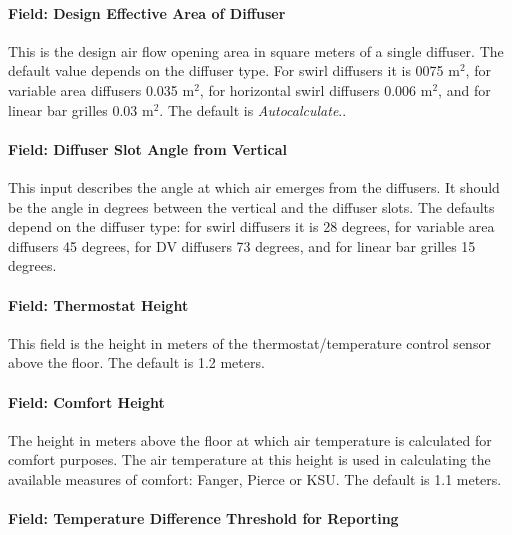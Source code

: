 \paragraph{Field: Design Effective Area of Diffuser}\label{field-design-effective-area-of-diffuser-1}

This is the design air flow opening area in square meters of a single diffuser. The default value depends on the diffuser type. For swirl diffusers it is 0075 m\(^{2}\), for variable area diffusers 0.035 m\(^{2}\), for horizontal swirl diffusers 0.006 m\(^{2}\), and for linear bar grilles 0.03 m\(^{2}\). The default is \emph{Autocalculate}..

\paragraph{Field: Diffuser Slot Angle from Vertical}\label{field-diffuser-slot-angle-from-vertical-1}

This input describes the angle at which air emerges from the diffusers. It should be the angle in degrees between the vertical and the diffuser slots. The defaults depend on the diffuser type: for swirl diffusers it is 28 degrees, for variable area diffusers 45 degrees, for DV diffusers 73 degrees, and for linear bar grilles 15 degrees.

\paragraph{Field: Thermostat Height}\label{field-thermostat-height-3}

This field is the height in meters of the thermostat/temperature control sensor above the floor. The default is 1.2 meters.

\paragraph{Field: Comfort Height}\label{field-comfort-height-2}

The height in meters above the floor at which air temperature is calculated for comfort purposes. The air temperature at this height is used in calculating the available measures of comfort: Fanger, Pierce or KSU. The default is 1.1 meters.

\paragraph{Field: Temperature Difference Threshold for Reporting}\label{field-temperature-difference-threshold-for-reporting-2}

